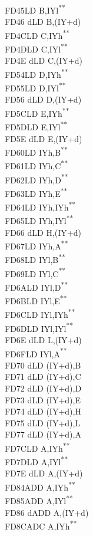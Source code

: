 \documentclass[twoside,openright,a4paper]{book}
\newcommand{\UNDOC}{\textnormal{\textsuperscript{**}}}
\begin{document}
\begin{multicols}{3}
{\begin{tabbing}
	FD45\>LD B,IYl\UNDOC\\
	FD46 d\>LD B,(IY+d)\\
	FD4C\>LD C,IYh\UNDOC\\
	FD4D\>LD C,IYl\UNDOC\\
	FD4E d\>LD C,(IY+d)\\
	FD54\>LD D,IYh\UNDOC\\
	FD55\>LD D,IYl\UNDOC\\
	FD56 d\>LD D,(IY+d)\\
	FD5C\>LD E,IYh\UNDOC\\
	FD5D\>LD E,IYl\UNDOC\\
	FD5E d\>LD E,(IY+d)\\
	FD60\>LD IYh,B\UNDOC\\
	FD61\>LD IYh,C\UNDOC\\
	FD62\>LD IYh,D\UNDOC\\
	FD63\>LD IYh,E\UNDOC\\
	FD64\>LD IYh,IYh\UNDOC\\
	FD65\>LD IYh,IYl\UNDOC\\
	FD66 d\>LD H,(IY+d)\\
	FD67\>LD IYh,A\UNDOC\\
	FD68\>LD IYl,B\UNDOC\\
	FD69\>LD IYl,C\UNDOC\\
	FD6A\>LD IYl,D\UNDOC\\
	FD6B\>LD IYl,E\UNDOC\\
	FD6C\>LD IYl,IYh\UNDOC\\
	FD6D\>LD IYl,IYl\UNDOC\\
	FD6E d\>LD L,(IY+d)\\
	FD6F\>LD IYl,A\UNDOC\\
	FD70 d\>LD (IY+d),B\\
	FD71 d\>LD (IY+d),C\\
	FD72 d\>LD (IY+d),D\\
	FD73 d\>LD (IY+d),E\\
	FD74 d\>LD (IY+d),H\\
	FD75 d\>LD (IY+d),L\\
	FD77 d\>LD (IY+d),A\\
	FD7C\>LD A,IYh\UNDOC\\
	FD7D\>LD A,IYl\UNDOC\\
	FD7E d\>LD A,(IY+d)\\
	FD84\>ADD A,IYh\UNDOC\\
	FD85\>ADD A,IYl\UNDOC\\
	FD86 d\>ADD A,(IY+d)\\
	FD8C\>ADC A,IYh\UNDOC\\

\end{tabbing}}
\end{multicols}
\end{document}
